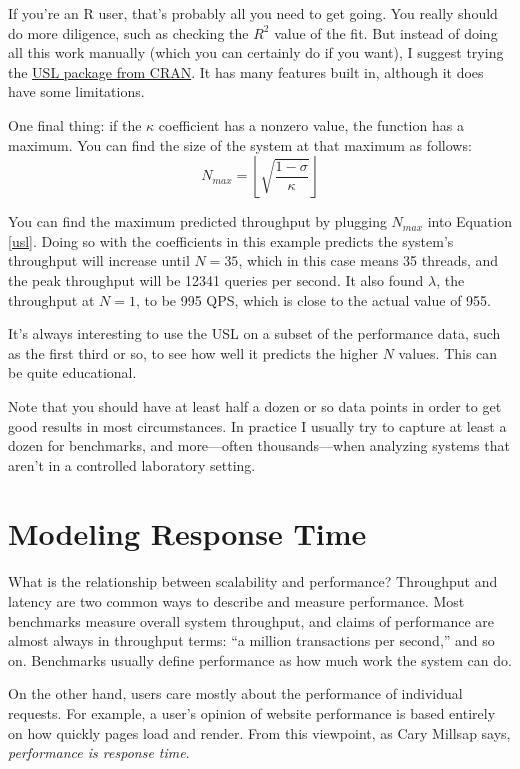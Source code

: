 \documentclass{vivid_layout}
\begin{document}
If you're an R user, that's probably all you need to get going. You really
should do more diligence, such as checking the $R^2$ value of the fit. But
instead of doing all this work manually (which you can certainly do if you
want), I suggest trying the
\href{https://cran.r-project.org/web/packages/usl/}{USL package from CRAN}. It
has many features built in, although it does have some limitations.

One final thing: if the $\kappa$ coefficient has a nonzero value, the function
has a maximum. You can find the size of the system at that maximum as follows:
\begin{equation}
N_{max} = \left \lfloor \sqrt{\frac{1-\sigma}{\kappa}} \right \rfloor
\label{n_max}
\end{equation}

You can find the maximum predicted throughput by plugging $N_{max}$
into Equation \ref{usl}. Doing so with the coefficients in this example
predicts the system's throughput will increase until $N=35$, which in this case
means 35 threads, and the peak throughput will be 12341 queries per second. It
also found $\lambda$, the throughput at $N=1$, to be 995 QPS, which is close to
the actual value of 955.

It's always interesting to use the USL on a subset of the performance data, such
as the first third or so, to see how well it predicts the higher $N$ values.
This can be quite educational.

Note that you should have at least half a dozen or so data points in order to
get good results in most circumstances. In practice I usually try to capture at
least a dozen for benchmarks, and more---often thousands---when analyzing
systems that aren't in a controlled laboratory setting.

\section{Modeling Response Time}

What is the relationship between scalability and performance?  Throughput and
latency are two common ways to describe and measure performance. Most benchmarks
measure overall system throughput, and claims of performance are almost always
in throughput terms: ``a million transactions per second,'' and so on.
Benchmarks usually define performance as how much work the system can do.

On the other hand, users care mostly about the performance of individual
requests. For example, a user's opinion of website performance is based entirely on
how quickly pages load and render.  From this viewpoint, as Cary Millsap says,
{\itshape performance is response time}.
\end{document}
